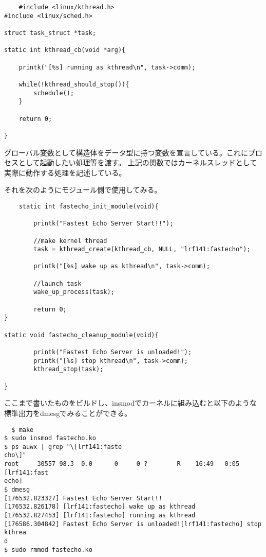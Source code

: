 \begin{verbatim}
    #include <linux/kthread.h>
#include <linux/sched.h>

struct task_struct *task;

static int kthread_cb(void *arg){

    printk("[%s] running as kthread\n", task->comm);

    while(!kthread_should_stop()){
        schedule();
    }

    return 0;

}
\end{verbatim}

グローバル変数として構造体をデータ型に持つ変数を宣言している。これにプロセスとして起動したい処理等を渡す。
上記の関数ではカーネルスレッドとして実際に動作する処理を記述している。

それを次のようにモジュール側で使用してみる。
\begin{verbatim}
    static int fastecho_init_module(void){

        printk("Fastest Echo Server Start!!");

        //make kernel thread
        task = kthread_create(kthread_cb, NULL, "lrf141:fastecho");
        
        printk("[%s] wake up as kthread\n", task->comm);

        //launch task
        wake_up_process(task);
        
        return 0;
}

static void fastecho_cleanup_module(void){

        printk("Fastest Echo Server is unloaded!");
        printk("[%s] stop kthread\n", task->comm);
        kthread_stop(task);

}
\end{verbatim}

ここまで書いたものをビルドし、insmodでカーネルに組み込むと以下のような標準出力をdmesgでみることができる。
\begin{verbatim}
  $ make
$ sudo insmod fastecho.ko
$ ps auwx | grep "\[lrf141:faste
cho\]"
root     30557 98.3  0.0      0     0 ?        R    16:49   0:05 [lrf141:fast
echo]
$ dmesg
[176532.823327] Fastest Echo Server Start!!
[176532.826178] [lrf141:fastecho] wake up as kthread
[176532.827453] [lrf141:fastecho] running as kthread
[176586.304842] Fastest Echo Server is unloaded![lrf141:fastecho] stop kthrea
d
$ sudo rmmod fastecho.ko
\end{verbatim}

